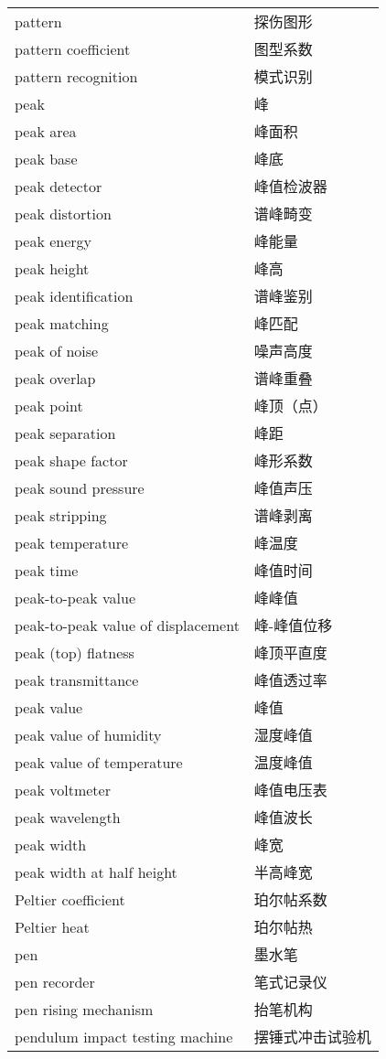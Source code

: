 \documentclass[
]{article}
\begin{document}
\begin{longtable}[]{@{}ll@{}}
pattern & 探伤图形 \\
pattern coefficient & 图型系数 \\
pattern recognition & 模式识别 \\
peak & 峰 \\
peak area & 峰面积 \\
peak base & 峰底 \\
peak detector & 峰值检波器 \\
peak distortion & 谱峰畸变 \\
peak energy & 峰能量 \\
peak height & 峰高 \\
peak identification & 谱峰鉴别 \\
peak matching & 峰匹配 \\
peak of noise & 噪声高度 \\
peak overlap & 谱峰重叠 \\
peak point & 峰顶（点） \\
peak separation & 峰距 \\
peak shape factor & 峰形系数 \\
peak sound pressure & 峰值声压 \\
peak stripping & 谱峰剥离 \\
peak temperature & 峰温度 \\
peak time & 峰值时间 \\
peak-to-peak value & 峰峰值 \\
peak-to-peak value of displacement & 峰-峰值位移 \\
peak (top) flatness & 峰顶平直度 \\
peak transmittance & 峰值透过率 \\
peak value & 峰值 \\
peak value of humidity & 湿度峰值 \\
peak value of temperature & 温度峰值 \\
peak voltmeter & 峰值电压表 \\
peak wavelength & 峰值波长 \\
peak width & 峰宽 \\
peak width at half height & 半高峰宽 \\
Peltier coefficient & 珀尔帖系数 \\
Peltier heat & 珀尔帖热 \\
pen & 墨水笔 \\
pen recorder & 笔式记录仪 \\
pen rising mechanism & 抬笔机构 \\
pendulum impact testing machine & 摆锤式冲击试验机 \\

\end{longtable}
\end{document}
